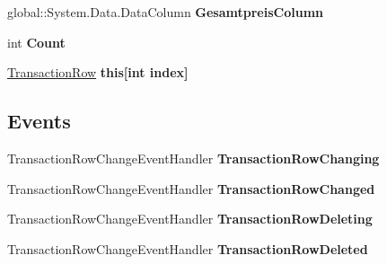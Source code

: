 \begin{DoxyCompactItemize}
\item 
global\+::\+System.\+Data.\+Data\+Column {\bfseries Gesamtpreis\+Column}\hypertarget{class_products_1_1_data_1_1ds_sage_1_1_transaction_data_table_a9740c998e258514794ef83da8e1a584d}{}\label{class_products_1_1_data_1_1ds_sage_1_1_transaction_data_table_a9740c998e258514794ef83da8e1a584d}

\item 
int {\bfseries Count}\hypertarget{class_products_1_1_data_1_1ds_sage_1_1_transaction_data_table_afdb925c886fff14246a8548cb80b598d}{}\label{class_products_1_1_data_1_1ds_sage_1_1_transaction_data_table_afdb925c886fff14246a8548cb80b598d}

\item 
\hyperlink{class_products_1_1_data_1_1ds_sage_1_1_transaction_row}{Transaction\+Row} {\bfseries this\mbox{[}int index\mbox{]}}\hypertarget{class_products_1_1_data_1_1ds_sage_1_1_transaction_data_table_a5dc5bbbf5ee5a2950fad980ce1988a78}{}\label{class_products_1_1_data_1_1ds_sage_1_1_transaction_data_table_a5dc5bbbf5ee5a2950fad980ce1988a78}

\end{DoxyCompactItemize}
\subsection*{Events}
\begin{DoxyCompactItemize}
\item 
Transaction\+Row\+Change\+Event\+Handler {\bfseries Transaction\+Row\+Changing}\hypertarget{class_products_1_1_data_1_1ds_sage_1_1_transaction_data_table_a51e82cb8e068fd22b33387e3d5613bed}{}\label{class_products_1_1_data_1_1ds_sage_1_1_transaction_data_table_a51e82cb8e068fd22b33387e3d5613bed}

\item 
Transaction\+Row\+Change\+Event\+Handler {\bfseries Transaction\+Row\+Changed}\hypertarget{class_products_1_1_data_1_1ds_sage_1_1_transaction_data_table_a7d6b083bfe0e3d05f12fd4ceccc1051c}{}\label{class_products_1_1_data_1_1ds_sage_1_1_transaction_data_table_a7d6b083bfe0e3d05f12fd4ceccc1051c}

\item 
Transaction\+Row\+Change\+Event\+Handler {\bfseries Transaction\+Row\+Deleting}\hypertarget{class_products_1_1_data_1_1ds_sage_1_1_transaction_data_table_a5b81301c59a635d0ae541cb945895f27}{}\label{class_products_1_1_data_1_1ds_sage_1_1_transaction_data_table_a5b81301c59a635d0ae541cb945895f27}

\item 
Transaction\+Row\+Change\+Event\+Handler {\bfseries Transaction\+Row\+Deleted}\hypertarget{class_products_1_1_data_1_1ds_sage_1_1_transaction_data_table_a008753f53ad88ddcc6eb83f00d534c2e}{}\label{class_products_1_1_data_1_1ds_sage_1_1_transaction_data_table_a008753f53ad88ddcc6eb83f00d534c2e}

\end{DoxyCompactItemize}


